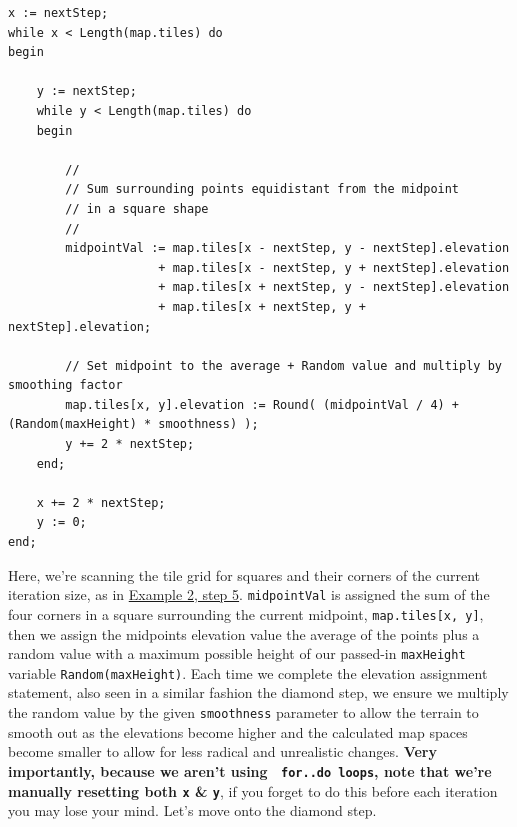 \documentclass{article}
\begin{document}
\begin{verbatim}
x := nextStep;
while x < Length(map.tiles) do
begin

	y := nextStep;
	while y < Length(map.tiles) do
	begin

		//
		// Sum surrounding points equidistant from the midpoint
		// in a square shape
		//
		midpointVal := map.tiles[x - nextStep, y - nextStep].elevation
					 + map.tiles[x - nextStep, y + nextStep].elevation
					 + map.tiles[x + nextStep, y - nextStep].elevation
					 + map.tiles[x + nextStep, y + nextStep].elevation;

		// Set midpoint to the average + Random value and multiply by smoothing factor
		map.tiles[x, y].elevation := Round( (midpointVal / 4) + (Random(maxHeight) * smoothness) );
		y += 2 * nextStep;
	end;

	x += 2 * nextStep;
	y := 0;
end;
\end{verbatim}

Here, we're scanning the tile grid for squares and their corners of the current iteration size, as in \hyperref[fig:graph]{Example 2, step 5}. \texttt{midpointVal} is assigned the sum of the four corners in a square surrounding the current midpoint, \texttt{map.tiles[x, y]}, then we assign the midpoints elevation value the average of the points plus a random value with a maximum possible height of our passed-in \texttt{maxHeight} variable \texttt{Random(maxHeight)}. Each time we complete the elevation assignment statement, also seen in a similar fashion the diamond step, we ensure we multiply the random value by the given \texttt{smoothness} parameter to allow the terrain to smooth out as the elevations become higher and the calculated map spaces become smaller to allow for less radical and unrealistic changes. \textbf{Very importantly, because we aren't using \ \texttt{for..do loops}, note that we're manually resetting both \texttt{x} \& \texttt{y}}, if you forget to do this before each iteration you may lose your mind. Let's move onto the diamond step.

\end{document}
